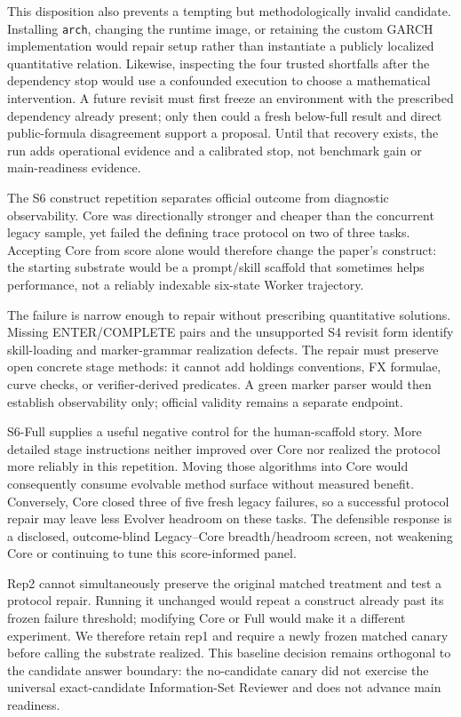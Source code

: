 This disposition also prevents a tempting but methodologically invalid
candidate. Installing \texttt{arch}, changing the runtime image, or retaining
the custom GARCH implementation would repair setup rather than instantiate a
publicly localized quantitative relation. Likewise, inspecting the four
trusted shortfalls after the dependency stop would use a confounded execution
to choose a mathematical intervention. A future revisit must first freeze an
environment with the prescribed dependency already present; only then could a
fresh below-full result and direct public-formula disagreement support a
proposal. Until that recovery exists, the run adds operational evidence and a
calibrated stop, not benchmark gain or main-readiness evidence.

The S6 construct repetition separates official outcome from diagnostic
observability. Core was directionally stronger and cheaper than the concurrent
legacy sample, yet failed the defining trace protocol on two of three tasks.
Accepting Core from score alone would therefore change the paper's construct:
the starting substrate would be a prompt/skill scaffold that sometimes helps
performance, not a reliably indexable six-state Worker trajectory.

The failure is narrow enough to repair without prescribing quantitative
solutions. Missing ENTER/COMPLETE pairs and the unsupported S4 revisit form
identify skill-loading and marker-grammar realization defects. The repair must
preserve open concrete stage methods: it cannot add holdings conventions, FX
formulae, curve checks, or verifier-derived predicates. A green marker parser
would then establish observability only; official validity remains a separate
endpoint.

S6-Full supplies a useful negative control for the human-scaffold story. More
detailed stage instructions neither improved over Core nor realized the
protocol more reliably in this repetition. Moving those algorithms into Core
would consequently consume evolvable method surface without measured benefit.
Conversely, Core closed three of five fresh legacy failures, so a successful
protocol repair may leave less Evolver headroom on these tasks. The defensible
response is a disclosed, outcome-blind Legacy--Core breadth/headroom screen,
not weakening Core or continuing to tune this score-informed panel.

Rep2 cannot simultaneously preserve the original matched treatment and test a
protocol repair. Running it unchanged would repeat a construct already past
its frozen failure threshold; modifying Core or Full would make it a different
experiment. We therefore retain rep1 and require a newly frozen matched canary
before calling the substrate realized. This baseline decision remains
orthogonal to the candidate answer boundary: the no-candidate canary did not
exercise the universal exact-candidate Information-Set Reviewer and does not
advance main readiness.

